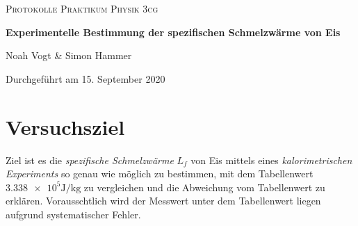 \documentclass[a4paper,12pt]{article}
\begin{document}
\begin{titlepage}

\vspace*{1cm}
	\centering
	
	{\scshape\Large Protokolle Praktikum Physik 3cg \par}
	\vspace{0.5cm}
	{\huge\bfseries Experimentelle Bestimmung der spezifischen Schmelzwärme von Eis\par}
	\vspace{0.5cm}
	{\Large Noah Vogt \& Simon Hammer\par}
	\vspace{0.5cm}

	{\large Durchgeführt am 15. September 2020\par}
	
\end{titlepage}

\tableofcontents
\pagebreak

\section{Versuchsziel}
Ziel ist es die \textit{spezifische Schmelzwärme} $L_f$ von Eis mittels eines \textit{kalorimetrischen Experiments} so genau wie möglich zu bestimmen, mit dem Tabellenwert $\num{3.338 e5}\si{\J\per\kg}$ \cite{formelsammlung} zu vergleichen und die Abweichung vom Tabellenwert zu erklären. Vorausschtlich wird der Messwert unter dem Tabellenwert liegen aufgrund systematischer Fehler.
\end{document}
